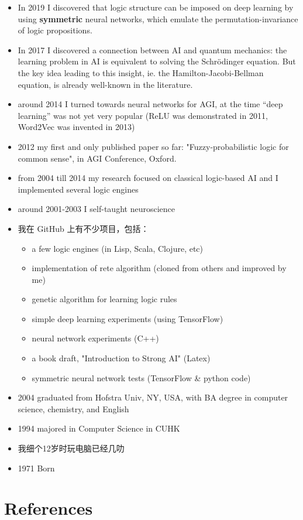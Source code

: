 \begin{itemize}
	\item In 2019 I discovered that logic structure can be imposed on deep learning by using \textbf{symmetric} neural networks, which emulate the permutation-invariance of logic propositions.
	\item In 2017 I discovered a connection between AI and quantum mechanics: the learning problem in AI is equivalent to solving the Schr\"{o}dinger equation.  But the key idea leading to this insight, ie. the Hamilton-Jacobi-Bellman equation, is already well-known in the literature.

	\item around 2014 I turned towards neural networks for AGI, at the time ``deep learning'' was not yet very popular (ReLU was demonstrated in 2011, Word2Vec was invented in 2013)
	\item 2012 my first and only published paper so far: "Fuzzy-probabilistic logic for common sense", in AGI Conference, Oxford.
	\item from 2004 till 2014 my research focused on classical logic-based AI and I implemented several logic engines
	\item around 2001-2003 I self-taught neuroscience

	\item 我在 GitHub 上有不少项目，包括：
	\begin{itemize}
		\item a few logic engines (in Lisp, Scala, Clojure, etc)
		\item implementation of rete algorithm (cloned from others and improved by me)
		\item genetic algorithm for learning logic rules
		\item simple deep learning experiments (using TensorFlow)
		\item neural network experiments (C++)
		\item a book draft, "Introduction to Strong AI" (Latex)
		\item symmetric neural network tests (TensorFlow \& python code)
	\end{itemize}

	\item 2004 graduated from Hofstra Univ, NY, USA, with BA degree in computer science, chemistry, and English
	\item 1994 majored in Computer Science in CUHK
	\item 我细个12岁时玩电脑已经几叻
	\item 1971 Born
\end{itemize}



\section*{References}

 

